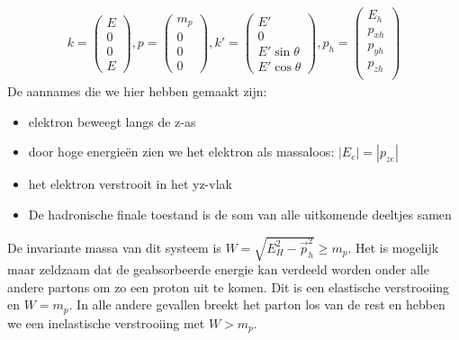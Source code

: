 \documentclass[../main.tex]{subfiles}
\begin{document}
\begin{equation}
    \begin{aligned}
        \label{eq:4_momenta_dis}
        k=
        \begin{pmatrix}
            E\\
            0\\
            0\\
            E
        \end{pmatrix},
        p=
        \begin{pmatrix}
            m_p\\
            0\\
            0\\
            0
        \end{pmatrix},
        k'=
        \begin{pmatrix}
            E'\\
            0\\
            E'\sin\theta\\
            E'\cos\theta
        \end{pmatrix},
        p_h=
        \begin{pmatrix}
            E_h\\
            p_{xh}\\
            p_{yh}\\
            p_{zh}\\
        \end{pmatrix}
    \end{aligned}
\end{equation}
De aannames die we hier hebben gemaakt zijn:
\begin{itemize}
    \item elektron beweegt langs de z-as
    \item door hoge energieën zien we het elektron als massaloos: $|E_e|=|p_{ze}|$
    \item het elektron verstrooit in het yz-vlak
    \item De hadronische finale toestand is de som van alle uitkomende deeltjes samen
\end{itemize}
De invariante massa van dit systeem is $W=\sqrt{E_H^2-\vec{p}^2_h}\geq m_p$. Het is mogelijk maar zeldzaam dat de geabsorbeerde energie kan verdeeld worden onder alle andere partons om zo een proton uit te komen. Dit is een elastische verstrooiing en $W=m_p$. In alle andere gevallen breekt het parton los van de rest en hebben we een inelastische verstrooiing met $W>m_p$.\\
\end{document}
